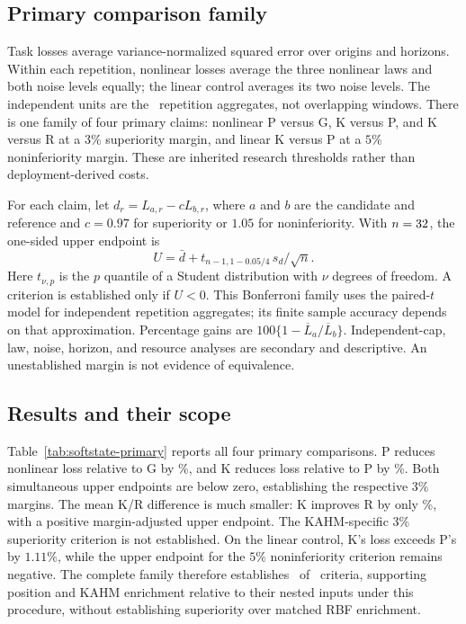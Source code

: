 \subsection{Primary comparison family}

Task losses average variance-normalized squared error over origins and
horizons. Within each repetition, nonlinear losses average the three
nonlinear laws and both noise levels equally; the linear control averages
its two noise levels. The independent units are the
\SARepetitions\ repetition aggregates, not overlapping windows.
There is one family of four primary claims: nonlinear P versus G, K
versus P, and K versus R at a $3\%$ superiority margin, and linear K
versus P at a $5\%$ noninferiority margin. These are inherited research
thresholds rather than deployment-derived costs.

For each claim, let $d_r=L_{a,r}-cL_{b,r}$, where $a$ and $b$ are the
candidate and reference and $c=0.97$ for superiority or $1.05$ for
noninferiority. With $n=32$, the one-sided upper endpoint is
\begin{equation}
 U=\bar d+t_{n-1,1-0.05/4}\,s_d/\sqrt n.
 \label{eq:softstate-primary-bound}
\end{equation}
Here $t_{\nu,p}$ is the $p$ quantile of a Student distribution with
$\nu$ degrees of freedom. A criterion is established only if $U<0$.
This Bonferroni family uses
the paired-$t$ model for independent repetition aggregates; its finite
sample accuracy depends on that approximation. Percentage gains are
$100\{1-\overline L_a/\overline L_b\}$. Independent-cap, law, noise,
horizon, and resource analyses are secondary and descriptive. An
unestablished margin is not evidence of equivalence.

\subsection{Results and their scope}

Table~\ref{tab:softstate-primary} reports all four primary comparisons.
P reduces nonlinear loss relative to G by \SAGainPG\%, and K reduces
loss relative to P by \SAGainKP\%. Both simultaneous upper endpoints
are below zero, establishing the respective $3\%$ margins.
The mean K/R difference is much smaller: K improves R by only
\SAGainKR\%, with a positive margin-adjusted upper endpoint. The
KAHM-specific $3\%$ superiority criterion is not established.
On the linear control, K's loss exceeds P's by $1.11\%$, while the
upper endpoint for the $5\%$ noninferiority criterion remains negative.
The complete family therefore establishes \SACriteriaEstablished\ of
\SAFamilySize\ criteria, supporting position and KAHM enrichment
relative to their nested inputs under this procedure, without
establishing superiority over matched RBF enrichment.

